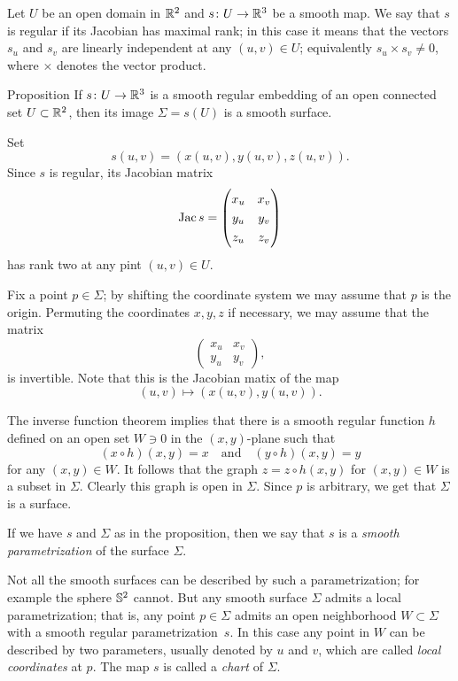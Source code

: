 Let $U$ be an open domain in $\mathbb{R}^2$ and $s\colon U\to \mathbb{R}^3$ be a smooth map.
We say that $s$ is regular if its Jacobian has maximal rank;
in this case it means that the vectors $s_u$ and $s_v$ are linearly independent at any $(u,v)\in U$;
equivalently $s_u\times s_v\ne 0$, where $\times$ denotes the vector product.

\begin{thm}{Proposition}\label{prop:graph-chart}
If $s\colon U\to \mathbb{R}^3$ is a smooth regular embedding %
of an open connected set $U\subset \mathbb{R}^2$, then its image $\Sigma=s(U)$ is a smooth surface.
\end{thm}

Set 
\[s(u,v)=(x(u,v),y(u,v),z(u,v)).\]
Since $s$ is regular, its Jacobian matrix
\[\Jac s=
\renewcommand\arraystretch{1.3}
\begin{pmatrix}
x_u&x_v\\
y_u&y_v\\
z_u&z_v
\end{pmatrix}
\]
has rank two at any pint $(u,v)\in U$.

Fix a point $p\in \Sigma$; by shifting the coordinate system we may assume that $p$ is the origin.
Permuting the coordinates $x,y,z$ if necessary, we may assume that 
the matrix 
\[
\renewcommand\arraystretch{1.3}
\begin{pmatrix}
x_u&x_v\\
y_u&y_v
\end{pmatrix},
\] 
is invertible.
Note that this is the Jacobian matix of the map
\[(u,v)\mapsto (x(u,v),y(u,v)).\]

The inverse function theorem implies that there is a smooth regular function $h$ defined on an open set $W\ni 0$ in the $(x,y)$-plane
such that 
\[(x\circ h)(x,y)=x\quad\text{and}\quad (y\circ h)(x,y)=y\]
for any $(x,y)\in W$.
It follows that the graph $z=z\circ h(x,y)$ for $(x,y)\in W$ is a subset in $\Sigma$.
Clearly this graph is open in $\Sigma$. %
Since $p$ is arbitrary, we get that $\Sigma$ is a surface.
\qeds

If we have $s$ and $\Sigma$ as in the proposition, then we say that $s$ is a \emph{smooth parametrization} of the surface $\Sigma$. 

Not all the smooth surfaces can be described by such a parametrization;
for example the sphere $\mathbb{S}^2$ cannot.
But any smooth surface $\Sigma$ admits a local parametrization; that is, any point $p\in\Sigma$ admits an open neighborhood $W\subset \Sigma$ with a smooth regular parametrization~$s$.
In this case any point in $W$ can be described by two parameters, usually denoted by $u$ and $v$, 
which are called \emph{local coordinates} at $p$.
The map $s$ is called a \emph{chart} of $\Sigma$.

